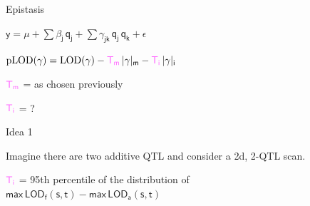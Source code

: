 \documentclass[12pt]{article}
\newcommand{\headsize}{\fontsize{35}{35} \selectfont}
\newcommand{\smallersize}{\fontsize{20}{25} \selectfont}
\newcommand{\lod}{\text{LOD}}
\newcommand{\plod}{\text{pLOD}}
\begin{document}
\newpage

\headsize \color{myyellow}
\hfill \begin{minipage}{5.75in}
\centering
Epistasis
\end{minipage}

\vspace{3cm} \color{mywhite} \smallersize

\hfill \begin{minipage}{10in}

\centerline{
$\mathsf{y  = \mu + \sum \beta_j \, q_j + \sum \gamma_{jk} \, q_j \,
    q_k + \epsilon}$
}

\vspace{3cm}

{\color{myyellow}
$\mathsf{ \plod(\gamma) = \lod(\gamma) -
    {\color{mypink} T_m} \, |\gamma|_m - {\color{mypink} T_i} \, |\gamma|_i }$
}


\vspace{15mm}

\hspace{3cm} $\mathsf{\color{mypink} T_m}$ = as chosen previously

\vspace{15mm}

\hspace{3cm} $\mathsf{\color{mypink} T_i}$ = ?



\end{minipage}



\newpage

\headsize \color{myyellow}
\hfill \begin{minipage}{5.75in}
\centering
Idea 1
\end{minipage}

\vspace{3cm} \color{mywhite} \smallersize

\hfill \begin{minipage}{10in}

Imagine there are two additive QTL and consider a 2d, 2-QTL scan.

\vspace{1cm}

\hspace*{0.5in} $\mathsf{\color{mypink} T_i}$ = 95th percentile of the
  distribution of \\[6pt]
\hspace*{1.3in} {\color{myblue} $\mathsf{ \text{max} \, \lod_f(s,t) -
    \text{max} \, \lod_a(s,t)}$}


\end{minipage}
\end{document}
